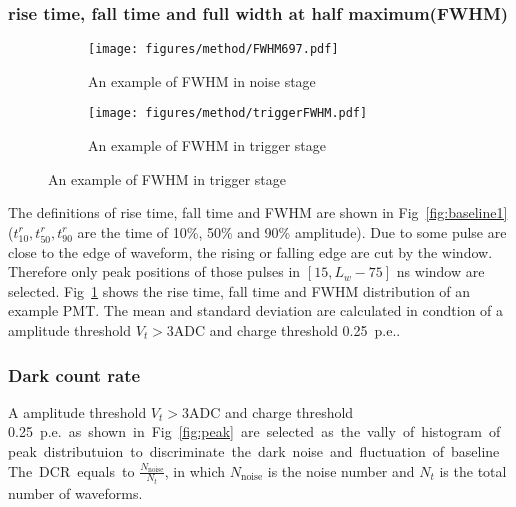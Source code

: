 \subsubsection{rise time, fall time and full width at half maximum(FWHM)}
\begin{figure}[!htbp]
    \centering
    \begin{subfigure}{0.47\textwidth}
        \texttt{[image: figures/method/FWHM697.pdf]}
        \caption{An example of FWHM in noise stage}
        \label{fig:risefallFWHM}
    \end{subfigure}
    \begin{subfigure}[]{0.47\textwidth}
        \texttt{[image: figures/method/triggerFWHM.pdf]}
        \caption{An example of FWHM in trigger stage}
        \label{fig:triggerFWHM}
    \end{subfigure}
\end{figure}
The definitions of rise time, fall time and FWHM are shown in Fig~\ref{fig:baseline1} ($t^r_{10}, t^r_{50}, t^r_{90}$ are the time of 10\%, 50\% and 90\% amplitude). Due to some pulse are close to the edge of waveform, the rising or falling edge are cut by the window. Therefore only peak positions of those pulses in $[15, L_w-75]$ ns window are selected. Fig~\ref{fig:risefallFWHM} shows the rise time, fall time and FWHM distribution of an example PMT. The mean and standard deviation are calculated in condtion of a amplitude threshold $V_{t}>3\mathrm{ADC}$ and charge threshold \SI{0.25}{p.e.}.

\subsubsection{Dark count rate}
A amplitude threshold $V_{t}>3\mathrm{ADC}$ and charge threshold \SI{0.25}{p.e.} as shown in Fig~\ref{fig:peak} are selected as the vally of histogram of peak distributuion to discriminate the dark noise and fluctuation of baseline. The DCR equals to $\frac{N_{\mathrm{noise}}}{N_{t}}$, in which $N_{\mathrm{noise}}$ is the noise number and $N_{t}$ is the total number of waveforms.

